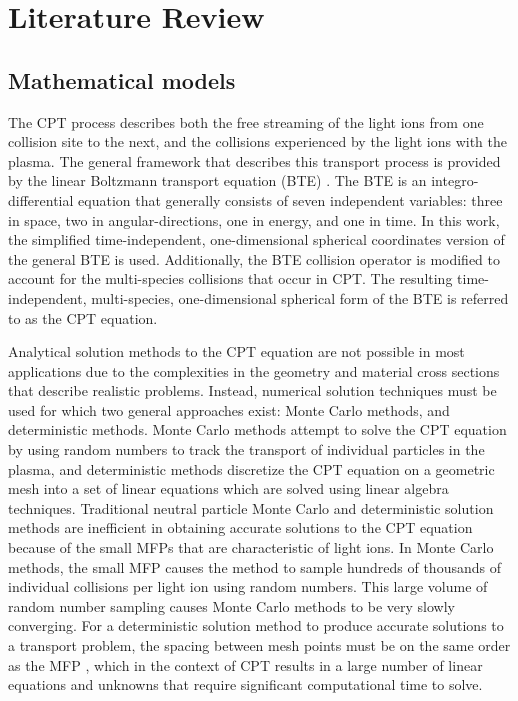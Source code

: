 \section{Literature Review}

\subsection{Mathematical models}
The CPT process describes both the free streaming of the light ions from one collision site to the next, and the collisions experienced by the light ions with the plasma. The general framework that describes this transport process is provided by the linear Boltzmann transport equation (BTE) \cite{Prinja-2010}. The BTE is an integro-differential equation that generally consists of seven independent variables: three in space, two in angular-directions, one in energy, and one in time. In this work, the simplified time-independent, one-dimensional spherical coordinates version of the general BTE is used. Additionally, the BTE collision operator is modified to account for the multi-species collisions that occur in CPT. The resulting time-independent, multi-species, one-dimensional spherical form of the BTE is referred to as the CPT equation.

Analytical solution methods to the CPT equation are not possible in most applications due to the complexities in the geometry and material cross sections that describe realistic problems. Instead, numerical solution techniques must be used for which two general approaches exist: Monte Carlo methods, and deterministic methods. Monte Carlo methods attempt to solve the CPT equation by using random numbers to track the transport of individual particles in the plasma, and deterministic methods discretize the CPT equation on a geometric mesh into a set of linear equations which are solved using linear algebra techniques. Traditional neutral particle Monte Carlo and deterministic solution methods are inefficient in obtaining accurate solutions to the CPT equation because of the small MFPs that are characteristic of light ions. In Monte Carlo methods, the small MFP causes the method to sample hundreds of thousands of individual collisions per light ion using random numbers. This large volume of random number sampling causes Monte Carlo methods to be very slowly converging. For a deterministic solution method to produce accurate solutions to a transport problem, the spacing between mesh points must be on the same order as the MFP \cite{Larsen-1999}, which in the context of CPT results in a large number of linear equations and unknowns that require significant computational time to solve. 

